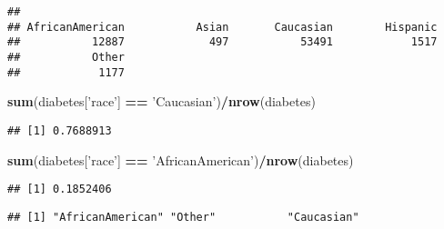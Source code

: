 \documentclass[
]{article}
\newenvironment{Shaded}{\begin{snugshade}}{\end{snugshade}}
\newcommand{\CommentTok}[1]{\textcolor[rgb]{0.56,0.35,0.01}{\textit{#1}}}
\newcommand{\KeywordTok}[1]{\textcolor[rgb]{0.13,0.29,0.53}{\textbf{#1}}}
\newcommand{\NormalTok}[1]{#1}
\newcommand{\OperatorTok}[1]{\textcolor[rgb]{0.81,0.36,0.00}{\textbf{#1}}}
\newcommand{\StringTok}[1]{\textcolor[rgb]{0.31,0.60,0.02}{#1}}
\begin{document}
\begin{verbatim}
## 
## AfricanAmerican           Asian       Caucasian        Hispanic 
##           12887             497           53491            1517 
##           Other 
##            1177
\end{verbatim}

\begin{Shaded}
\begin{Highlighting}[]
\KeywordTok{sum}\NormalTok{(diabetes[}\StringTok{'race'}\NormalTok{] }\OperatorTok{==}\StringTok{ 'Caucasian'}\NormalTok{)}\OperatorTok{/}\KeywordTok{nrow}\NormalTok{(diabetes) }
\end{Highlighting}
\end{Shaded}

\begin{verbatim}
## [1] 0.7688913
\end{verbatim}

\begin{Shaded}
\begin{Highlighting}[]
\KeywordTok{sum}\NormalTok{(diabetes[}\StringTok{'race'}\NormalTok{] }\OperatorTok{==}\StringTok{ 'AfricanAmerican'}\NormalTok{)}\OperatorTok{/}\KeywordTok{nrow}\NormalTok{(diabetes)}
\end{Highlighting}
\end{Shaded}

\begin{verbatim}
## [1] 0.1852406
\end{verbatim}

\begin{Shaded}
\end{Shaded}

\begin{verbatim}
## [1] "AfricanAmerican" "Other"           "Caucasian"
\end{verbatim}
\end{document}
